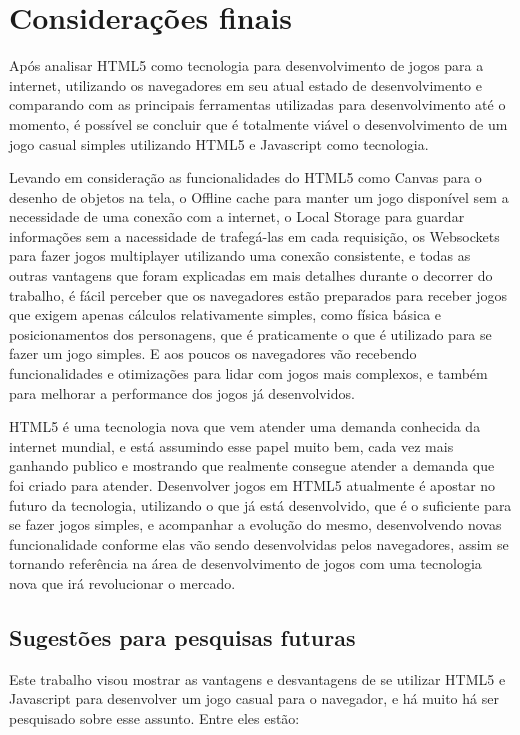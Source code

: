 \section{Considerações finais}

Após analisar HTML5 como tecnologia para desenvolvimento de jogos para
a internet, utilizando os navegadores em seu atual estado de
desenvolvimento e comparando com as principais ferramentas utilizadas
para desenvolvimento até o momento, é possível se concluir que é
totalmente viável o desenvolvimento de um jogo casual simples
utilizando HTML5 e Javascript como tecnologia.

Levando em consideração as funcionalidades do HTML5 como Canvas para o
desenho de objetos na tela, o Offline cache para manter um jogo
disponível sem a necessidade de uma conexão com a internet, o Local
Storage para guardar informações sem a nacessidade de trafegá-las em
cada requisição, os Websockets para fazer jogos multiplayer utilizando
uma conexão consistente, e todas as outras vantagens que foram
explicadas em mais detalhes durante o decorrer do trabalho,
é fácil perceber que os navegadores estão preparados para
receber jogos que exigem apenas cálculos relativamente
simples, como física básica e posicionamentos dos personagens, que é
praticamente o que é utilizado para se fazer um jogo simples. E aos
poucos os navegadores vão recebendo funcionalidades e otimizações para
lidar com jogos mais complexos, e também para melhorar a performance
dos jogos já desenvolvidos.

HTML5 é uma tecnologia nova que vem atender uma demanda conhecida da
internet mundial, e está assumindo esse papel muito bem, cada vez mais
ganhando publico e mostrando que realmente consegue atender a demanda
que foi criado para atender. Desenvolver jogos em HTML5 atualmente é
apostar no futuro da tecnologia, utilizando o que já está
desenvolvido, que é o suficiente para se fazer jogos simples, e
acompanhar a evolução do mesmo, desenvolvendo novas funcionalidade
conforme elas vão sendo desenvolvidas pelos navegadores, assim se
tornando referência na área de desenvolvimento de jogos com uma
tecnologia nova que irá revolucionar o mercado.

\subsection{Sugestões para pesquisas futuras}

Este trabalho visou mostrar as vantagens e desvantagens de se utilizar
HTML5 e Javascript para desenvolver um jogo casual para o navegador,
e há muito há ser pesquisado sobre esse assunto. Entre eles
estão:

